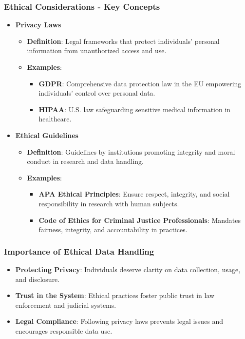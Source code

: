 \documentclass[aspectratio=169]{beamer}
\begin{document}
\begin{frame}[fragile]
    \frametitle{Ethical Considerations - Key Concepts}
    \begin{itemize}
        \item \textbf{Privacy Laws}
        \begin{itemize}
            \item \textbf{Definition}: Legal frameworks that protect individuals' personal information from unauthorized access and use.
            \item \textbf{Examples}:
            \begin{itemize}
                \item \textbf{GDPR}: Comprehensive data protection law in the EU empowering individuals' control over personal data.
                \item \textbf{HIPAA}: U.S. law safeguarding sensitive medical information in healthcare.
            \end{itemize}
        \end{itemize}

        \item \textbf{Ethical Guidelines}
        \begin{itemize}
            \item \textbf{Definition}: Guidelines by institutions promoting integrity and moral conduct in research and data handling.
            \item \textbf{Examples}:
            \begin{itemize}
                \item \textbf{APA Ethical Principles}: Ensure respect, integrity, and social responsibility in research with human subjects.
                \item \textbf{Code of Ethics for Criminal Justice Professionals}: Mandates fairness, integrity, and accountability in practices.
            \end{itemize}
        \end{itemize}
    \end{itemize}
\end{frame}

\begin{frame}[fragile]
    \frametitle{Importance of Ethical Data Handling}
    \begin{itemize}
        \item \textbf{Protecting Privacy}: Individuals deserve clarity on data collection, usage, and disclosure.
        \item \textbf{Trust in the System}: Ethical practices foster public trust in law enforcement and judicial systems.
        \item \textbf{Legal Compliance}: Following privacy laws prevents legal issues and encourages responsible data use.
    \end{itemize}
\end{frame}
\end{document}
